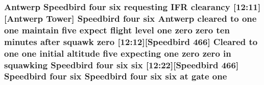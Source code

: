 \subsubsection[{\texorpdfstring{one}{one}}]{\setlength{\rightskip}{0pt plus 5cm}Antwerp Speedbird four {\bf six} requesting I\+FR clearancy \mbox{[}12\+:11\mbox{]}\mbox{[}Antwerp {\bf Tower}\mbox{]} Speedbird four {\bf six} Antwerp cleared to one one maintain five expect flight level one {\bf zero} {\bf zero} {\bf ten} minutes after squawk {\bf zero} \mbox{[}12\+:12\mbox{]}\mbox{[}Speedbird 466\mbox{]} Cleared to one one initial altitude five expecting one {\bf zero} {\bf zero} in {\bf squawking} Speedbird four {\bf six} {\bf six} \mbox{[}12\+:22\mbox{]}\mbox{[}Speedbird 466\mbox{]} Speedbird four {\bf six} Speedbird four {\bf six} {\bf six} at gate one}\hypertarget{happyDay4ExpectedATC_8txt_a1bdf675837626f29e859d1a241701d26}{}\label{happyDay4ExpectedATC_8txt_a1bdf675837626f29e859d1a241701d26}
